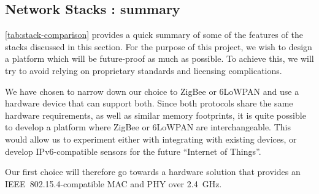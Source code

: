 \subsection{Network Stacks : summary}

\autoref{tab:stack-comparison} provides a quick summary of some of the features
of the stacks discussed in this section.  For the purpose of this project, we
wish to design a platform which will be future-proof as much as possible. To
achieve this, we will try to avoid relying on proprietary standards and
licensing complications. 

\begin{table}[h]
    \myfloatalign
  \caption[Network stack summary]{Network stack summary}
  \label{tab:stack-comparison}
\end{table}


We have chosen to narrow down our choice to ZigBee or 6LoWPAN and use a hardware
device that can support both. Since both protocols share the same hardware
requirements, as well as similar memory footprints, it is quite possible to
develop a platform where ZigBee or 6LoWPAN are interchangeable. This would allow
us to experiment either with integrating with existing devices, or develop
IPv6-compatible sensors for the future ``Internet of Things''.

Our first choice will therefore go towards a hardware solution that provides an
IEEE~802.15.4-compatible MAC and PHY over \SI{2.4}{GHz}.

